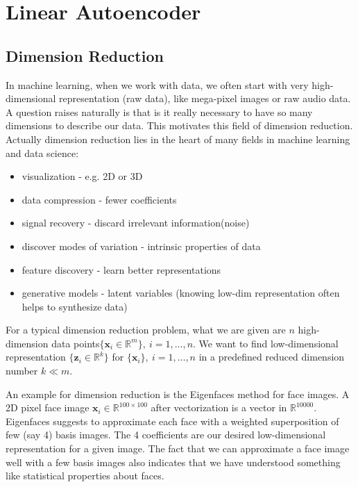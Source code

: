 \documentclass[../book-template.tex]{subfiles}
\begin{document}
\chapter{Linear Autoencoder}

\section{Dimension Reduction}
In machine learning, when we work with data, we often start with very high-dimensional representation (raw data), like mega-pixel images or raw audio data. A question raises naturally is that is it really necessary to have so many dimensions to describe our data. This motivates this field of dimension reduction. Actually dimension reduction lies in the heart of many fields in machine learning and data science:
\begin{itemize}
    \item visualization - e.g. 2D or 3D
    \item data compression - fewer coefficients
    \item signal recovery - discard irrelevant information(noise)
    \item discover modes of variation - intrinsic properties of data
    \item feature discovery - learn better representations
    \item generative models - latent variables (knowing low-dim representation often helps to synthesize data)
\end{itemize}
\par For a typical dimension reduction problem, what we are given are $n$ high-dimension data points$\{\bm{x}_i\in\mathbb{R}^{m}\},\ i=1,\dots,n$.
We want to find low-dimensional representation $\{\bm{z}_i\in \mathbb{R}^k\}$ for $\{\bm{x}_i\},\ i=1,\dots,n$ in a predefined reduced dimension number $k\ll m$.
\par An example for dimension reduction is the Eigenfaces method for face images. A 2D pixel face image $\bm{x}_i\in \mathbb{R}^{100\times 100}$ after vectorization is a vector in $\mathbb{R}^{10000}$. Eigenfaces suggests to approximate each face with a weighted superposition of few (say 4) basis images. The 4 coefficients are our desired low-dimensional representation for a given image. The fact that we can approximate a face image well with a few basis images also indicates that we have understood something like statistical properties about faces.
\end{document}
